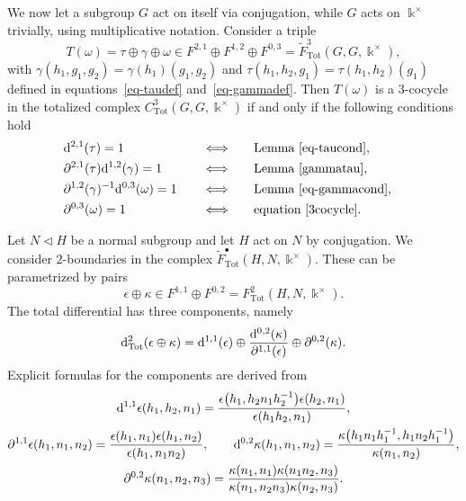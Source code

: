 \documentclass[pdftex]{sigma}
\numberwithin{equation}{section}
\newcommand{\deri}{{\rm d}}
\newcommand{\wF}{\widetilde{F}}
\newcommand{\Tot}{\mathrm{Tot}}
\begin{document}
\begin{Example}
We now let a subgroup $G$ act on itself via conjugation, while $G$ acts on $\Bbbk^\times$ trivially, using multiplicative notation. Consider a triple
\[T(\omega)=\tau\oplus \gamma \oplus \omega\in F^{2,1} \oplus F^{1,2}\oplus F^{0,3}=\wF^3_{\Tot}(G,G,\Bbbk^\times),\]
with $\gamma(h_1,g_1,g_2)=\gamma(h_1)(g_1,g_2)$ and $\tau(h_1,h_2,g_1)=\tau(h_1,h_2)(g_1)$ defined in equations~\eqref{eq-taudef} and~\eqref{eq-gammadef}.
Then
$T(\omega)$ is a $3$-cocycle in the totalized complex $C^3_{\Tot}(G,G,\Bbbk^\times)$ if and only if the following conditions hold
\begin{alignat*}{4}
&\deri^{2,1}(\tau)=1 && \Longleftrightarrow && \text{Lemma~\ref{eq-taucond}},&\\
&\partial^{2,1}(\tau)\deri^{1,2}(\gamma)=1 && \Longleftrightarrow && \text{Lemma~\ref{gammatau}},&\\
&\partial^{1,2}(\gamma)^{-1}\deri^{0,3}(\omega)=1\quad && \Longleftrightarrow\quad && \text{Lemma~\ref{eq-gammacond}},&\\
&\partial^{0,3}(\omega)=1 && \Longleftrightarrow && \text{equation~\eqref{3cocycle}}.&
\end{alignat*}
\end{Example}



\begin{Example}
Let $N\triangleleft H$ be a normal subgroup and let $H$ act on $N$ by conjugation. We consider $2$-boundaries in the complex $\wF_{\Tot}^{\bullet}(H,N,\Bbbk^\times)$. These can be parametrized by pairs
\[\epsilon \oplus \kappa\in F^{1,1}\oplus F^{0,2}=F^2_{\Tot}(H,N,\Bbbk^\times).\]
The total differential has three components, namely
\[\deri_{\Tot}^2(\epsilon \oplus \kappa)=\deri^{1,1}(\epsilon)\oplus \frac{\deri^{0,2}(\kappa)}{\partial^{1,1}(\epsilon)}\oplus\partial^{0,2}(\kappa).\]
Explicit formulas for the components are derived from
\begin{gather*}
\deri^{1,1}\epsilon(h_1,h_2,n_1)=\frac{ \epsilon\big(h_1,h_2n_1h_2^{-1}\big)\epsilon(h_2,n_1)}{\epsilon(h_1h_2,n_1)},\\
\partial^{1,1}\epsilon(h_1,n_1,n_2)=\frac{\epsilon(h_1,n_1)\epsilon(h_1,n_2)}{\epsilon(h_1,n_1n_2)}, \qquad
\deri^{0,2}\kappa(h_1,n_1,n_2)=\frac{\kappa\big(h_1n_1h_1^{-1},h_1n_2h_1^{-1}\big)}{\kappa(n_1,n_2)},\\
\partial^{0,2}\kappa(n_1,n_2,n_3)=\frac{\kappa(n_1,n_1)\kappa(n_1n_2,n_3)}{\kappa(n_1,n_2n_3)\kappa(n_2,n_3)}.
\end{gather*}
\end{Example}
\end{document}

